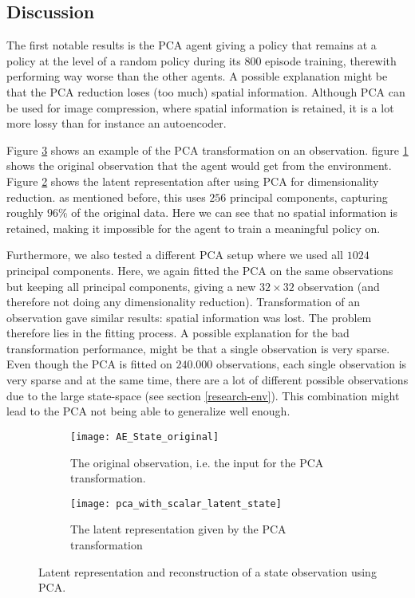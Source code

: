 \subsection{Discussion}\label{research-discussion}
The first notable results is the PCA agent giving a policy that remains at a policy at the level of a random policy during its $800$ episode training, therewith performing way worse than the other agents. A possible explanation might be that the PCA reduction loses (too much) spatial information. Although PCA can be used for image compression, where spatial information is retained, it is a lot more lossy than for instance an autoencoder.

Figure \ref{fig:pca-state} shows an example of the PCA transformation on an observation. figure \ref{fig:pca-original} shows the original observation that the agent would get from the environment. Figure \ref{fig:pca-latent} shows the latent representation after using PCA for dimensionality reduction. as mentioned before, this uses $256$ principal components, capturing roughly $96\%$ of the original data. Here we can see that no spatial information is retained, making it impossible for the agent to train a meaningful policy on. 

Furthermore, we also tested a different PCA setup where we used all $1024$ principal components. Here, we again fitted the PCA on the same observations but keeping all principal components, giving a new $32 \times 32$ observation (and therefore not doing any dimensionality reduction). Transformation of an observation gave similar results: spatial information was lost. The problem therefore lies in the fitting process. A possible explanation for the bad transformation performance, might be that a single observation is very sparse. Even though the PCA is fitted on $240.000$ observations, each single observation is very sparse and at the same time, there are a lot of different possible observations due to the large state-space (see section \ref{research-env}). This combination might lead to the PCA not being able to generalize well enough. 

\begin{figure}[h]
	\centering
	\begin{subfigure}[b]{0.75\textwidth}
		\texttt{[image: AE\_State\_original]}
		\caption{The original observation, i.e. the input for the PCA transformation.}
		\label{fig:pca-original} 
	\end{subfigure}
	\begin{subfigure}[b]{0.75\textwidth}
		\texttt{[image: pca\_with\_scalar\_latent\_state]}
		\caption{The latent representation given by the PCA transformation}
		\label{fig:pca-latent}
	\end{subfigure}
	\caption{Latent representation and reconstruction of a state observation using PCA.}
	\label{fig:pca-state}
\end{figure}

